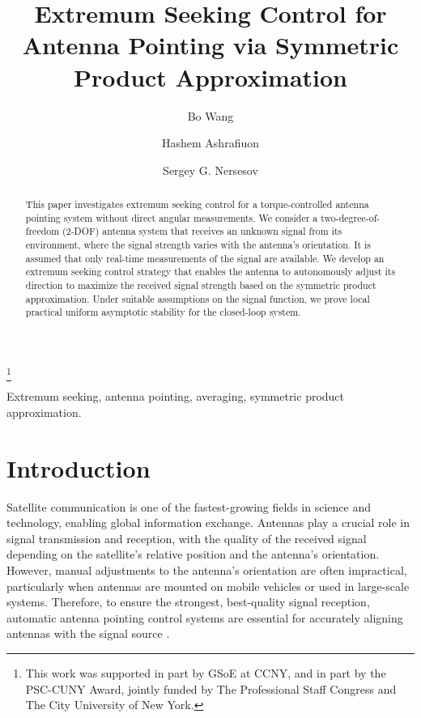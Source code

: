 \documentclass{ifacconf}
\begin{document}
\begin{frontmatter}

\title{Extremum Seeking Control for Antenna Pointing via Symmetric Product Approximation} 

\thanks[footnoteinfo]{This work was supported in part by GSoE at CCNY, and in part by the PSC-CUNY Award, jointly funded by The Professional Staff Congress and The City University of New York.}

\author[CCNY]{Bo Wang} 
\author[VU]{Hashem Ashrafiuon} 
\author[VU]{Sergey G. Nersesov} 

\address[CCNY]{Department of Mechanical Engineering, The City College of New York, New York, NY 10031, USA (e-mail: bwang1@ccny.cuny.edu).}
\address[VU]{Department of Mechanical Engineering, Villanova University, Villanova, PA 19085, USA (e-mail: \{hashem.ashrafiuon, sergey.nersesov\}@villanova.edu)}

\begin{abstract}                %
This paper investigates extremum seeking control for a torque-controlled antenna pointing system without direct angular measurements. We consider a two-degree-of-freedom (2-DOF) antenna system that receives an unknown signal from its environment, where the signal strength varies with the antenna’s orientation. It is assumed that only real-time measurements of the signal are available. We develop an extremum seeking control strategy that enables the antenna to autonomously adjust its direction to maximize the received signal strength based on the symmetric product approximation. Under suitable assumptions on the signal function, we prove local practical uniform asymptotic stability for the closed-loop system.
\end{abstract}

\begin{keyword}
Extremum seeking, antenna pointing, averaging, symmetric product approximation.
\end{keyword}

\end{frontmatter}

\section{Introduction}

Satellite communication is one of the fastest-growing fields in science and technology, enabling global information exchange. Antennas play a crucial role in signal transmission and reception, with the quality of the received signal depending on the satellite's relative position and the antenna's orientation. However, manual adjustments to the antenna's orientation are often impractical, particularly when antennas are mounted on mobile vehicles or used in large-scale systems. Therefore, to ensure the strongest, best-quality signal reception, automatic antenna pointing control systems are essential for accurately aligning antennas with the signal source \citep{mulla2016overview}. 
\end{document}
